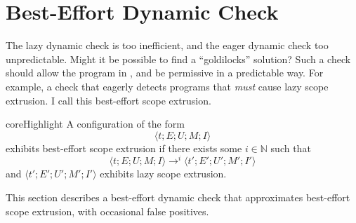 \section{Best-Effort Dynamic Check}\label{section:best-effort-check}
The lazy dynamic check is too inefficient, and the eager dynamic check too unpredictable. Might it be possible to find a ``goldilocks'' solution? Such a check should allow the program in , and be permissive in a predictable way. For example, a check that eagerly detects programs that \textit{must} cause lazy scope extrusion. I call this best-effort scope extrusion.

\begin{definition}{coreHighlight} A \coreLang{} configuration of the form 
\[\langle t;E;U;M;I\rangle\]  
exhibits best-effort scope extrusion if there exists some $i \in \mathbb{N}$ such that 
\[ \langle t;E;U;M;I\rangle \to^{i} \langle t';E';U';M';I'\rangle\]
and $\langle t';E';U';M';I'\rangle$ exhibits lazy scope extrusion.
\end{definition}

This section describes a best-effort dynamic check that approximates best-effort scope extrusion, with occasional false positives. 

